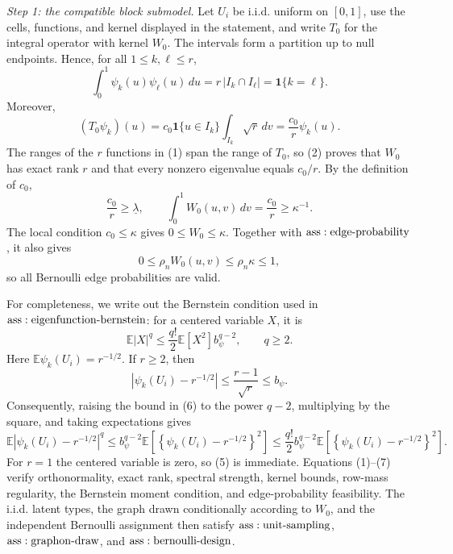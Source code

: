 \textit{Step 1: the compatible block submodel.}
Let \(U_i\) be i.i.d. uniform on \([0,1]\), use the cells, functions, and kernel displayed in the statement, and write \(T_0\) for the integral operator with kernel \(W_0\).  The intervals form a partition up to null endpoints.  Hence, for all \(1\leq k,\ell\leq r\),
\[
 \int_0^1\psi_k(u)\psi_\ell(u)\,du
 =r\,|I_k\cap I_\ell|=\mathbf 1\{k=\ell\}.
\tag{1}
\]
Moreover,
\[
 (T_0\psi_k)(u)
 =c_0\mathbf 1\{u\in I_k\}\int_{I_k}\sqrt r\,dv
 =\frac{c_0}{r}\psi_k(u).
\tag{2}
\]
The ranges of the \(r\) functions in (1) span the range of \(T_0\), so (2) proves that \(W_0\) has exact rank \(r\) and that every nonzero eigenvalue equals \(c_0/r\).  By the definition of \(c_0\),
\[
 \frac{c_0}{r}\geq\underline\lambda,
 \qquad
 \int_0^1W_0(u,v)\,dv=\frac{c_0}{r}\geq\kappa^{-1}.
\tag{3}
\]
The local condition \(c_0\leq\kappa\) gives \(0\leq W_0\leq\kappa\).  Together with \({\rm ass:edge\text{-}probability}\), it also gives
\[
 0\leq\rho_nW_0(u,v)\leq\rho_n\kappa\leq1,
\tag{4}
\]
so all Bernoulli edge probabilities are valid.

For completeness, we write out the Bernstein condition used in \({\rm ass:eigenfunction\text{-}bernstein}\): for a centered variable \(X\), it is
\[
 \mathbb E|X|^q\leq\frac{q!}{2}\mathbb E[X^2]b_\psi^{q-2},
 \qquad q\geq2.
\tag{5}
\]
Here \(\mathbb E\psi_k(U_i)=r^{-1/2}\).  If \(r\geq2\), then
\[
 \left|\psi_k(U_i)-r^{-1/2}\right|
 \leq\frac{r-1}{\sqrt r}\leq b_\psi.
\tag{6}
\]
Consequently, raising the bound in (6) to the power \(q-2\), multiplying by the square, and taking expectations gives
\[
 \mathbb E\left|\psi_k(U_i)-r^{-1/2}\right|^q
 \leq b_\psi^{q-2}\mathbb E\left[\left\{\psi_k(U_i)-r^{-1/2}\right\}^2\right]
 \leq\frac{q!}{2}b_\psi^{q-2}\mathbb E\left[\left\{\psi_k(U_i)-r^{-1/2}\right\}^2\right].
\tag{7}
\]
For \(r=1\) the centered variable is zero, so (5) is immediate.  Equations (1)--(7) verify orthonormality, exact rank, spectral strength, kernel bounds, row-mass regularity, the Bernstein moment condition, and edge-probability feasibility.  The i.i.d. latent types, the graph drawn conditionally according to \(W_0\), and the independent Bernoulli assignment then satisfy \({\rm ass:unit\text{-}sampling}\), \({\rm ass:graphon\text{-}draw}\), and \({\rm ass:bernoulli\text{-}design}\).

